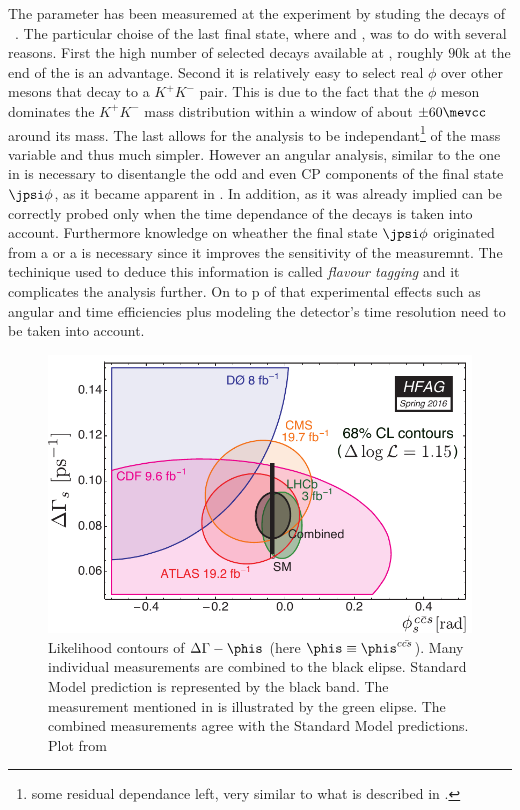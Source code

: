 The parameter \phis has been measuremed at the \lhcb experiment by studing the decays of \BsJpsiPhi~\cite{phis-3fb-paper}.
The particular choise of the last final state, where \phiKK and \Jpsimumu, was to do with several reasons. First the high number
of selected \BsJpsiPhi decays available at \lhcb, roughly $90$k at the end of the \runtwo is an advantage. Second it is relatively easy
to select real $\phi$ over other mesons that decay to a $K^+K^-$ pair. This is due to the fact that the $\phi$ meson dominates the
$K^+K^-$ mass distribution within a window of about $\pm 60 \mevcc$ around its mass. The last allows for the analysis to be
independant\footnote{some residual dependance left, very similar to what is described in . }
of the \mkk mass variable and thus much simpler. However an angular analysis, similar to the one in  is necessary
to disentangle the odd and even CP components of the final state $\jpsi\phi$, as it became apparent in .
In addition, as it was already implied \phis can be correctly probed only when the time dependance of the \BsJpsiPhi decays is taken into
account. Furthermore knowledge on wheather the final state $\jpsi\phi$ originated from a \Bs or a \Bsb is necessary since it
improves the sensitivity of the \phis measuremnt. The techinique used to deduce this information is called {\it flavour tagging}
and it complicates the analysis further. On to p of that experimental effects such as angular and time efficiencies plus modeling the
\lhcb detector's time resolution need to be taken into account.

\begin{figure}[h]
  \begin{center}
    \includegraphics[trim=0cm 0cm 0cm 0cm, clip=true, scale=0.8]{Figures/Chapter1/hfag_Spring2016_DGsphis_zoom.pdf}
    \caption{Likelihood contours of $\Delta\Gamma-\phis$ (here $\phis\equiv \phis^{c\bar{cs}}$). Many individual measurements are
             combined to the black elipse. Standard Model prediction is represented by the black band. The \lhcb measurement
             mentioned in  is illustrated by the green elipse. The combined measurements agree with the Standard Model
             predictions. Plot from \cite{hfag-2014} }
    \label{hfag_phis_dg}
  \end{center}
\end{figure}

